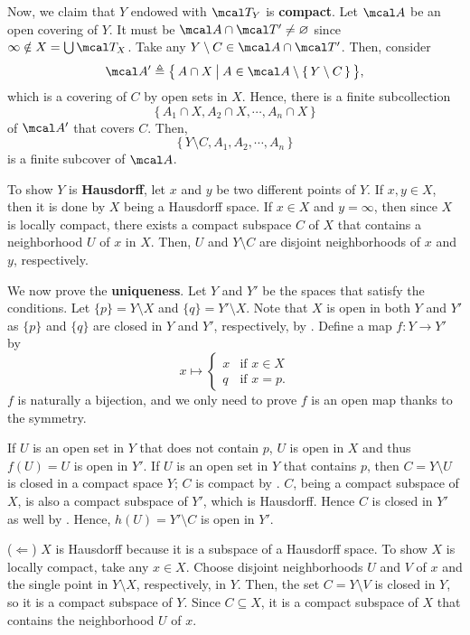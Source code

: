 \documentclass[MAS331_Note.tex]{subfiles}
\begin{document}
{    Now, we claim that $Y$ endowed with $\mcal T_Y$ is \textbf{compact}.
    Let $\mcal A$ be an open covering of $Y$.
    It must be $\mcal A \cap \mcal T' \neq \varnothing$
    since $\infty \notin X = \bigcup \mcal T_X$.
    Take any $Y \setminus C \in \mcal A \cap \mcal T'$.
    Then, consider
    \[
        \mcal A' \triangleq \big\{\,A \cap X \:\big|\:
        A \in \mcal A \setminus \{\,Y \setminus C\,\}\,\big\}\text{,}
    \]
    which is a covering of $C$ by open sets in $X$.
    Hence, there is a finite subcollection
    \[
        \{\,A_1 \cap X, A_2 \cap X, \cdots, A_n \cap X\,\}
    \]
    of $\mcal A'$ that covers $C$.
    Then,
    \[
        \{\,Y \setminus C, A_1, A_2, \cdots, A_n\,\}
    \]
    is a finite subcover of $\mcal A$.

    To show $Y$ is \textbf{Hausdorff}, let $x$ and $y$ be
    two different points of $Y$.
    If $x, y \in X$, then it is done by
    $X$ being a Hausdorff space.
    If $x \in X$ and $y = \infty$,
    then since $X$ is locally compact,
    there exists a compact subspace $C$ of $X$
    that contains a neighborhood $U$ of $x$ in $X$.
    Then, $U$ and $Y \setminus C$
    are disjoint neighborhoods of $x$ and $y$, respectively.

    We now prove the \textbf{uniqueness}.
    Let $Y$ and $Y'$ be the spaces that satisfy the conditions.
    Let $\{p\} = Y \setminus X$ and $\{q\} = Y' \setminus X$.
    Note that $X$ is open in both $Y$ and $Y'$
    as $\{p\}$ and $\{q\}$ are closed in $Y$ and $Y'$, respectively,
    by .
    Define a map $f \colon Y \to Y'$ by
    \[
        x \mapsto \begin{cases}
            x & \text{if } x \in X \\
            q & \text{if } x = p\text{.}
        \end{cases}
    \]
    $f$ is naturally a bijection, and we only need to prove
    $f$ is an open map thanks to the symmetry.

    If $U$ is an open set in $Y$ that does not contain $p$,
    $U$ is open in $X$ and thus $f(U) = U$ is open in $Y'$.
    If $U$ is an open set in $Y$ that contains $p$,
    then $C = Y \setminus U$ is closed in a compact space $Y$;
    $C$ is compact by .
    $C$, being a compact subspace of $X$,
    is also a compact subspace of $Y'$, which is Hausdorff.
    Hence $C$ is closed in $Y'$ as well by .
    Hence, $h(U) = Y' \setminus C$ is open in $Y'$.
    
    ($\Leftarrow$)
    $X$ is Hausdorff because it is a subspace of a Hausdorff space.
    To show $X$ is locally compact, take any $x \in X$.
    Choose disjoint neighborhoods $U$ and $V$ of $x$ and the single point in
    $Y \setminus X$, respectively, in $Y$. Then, the set $C = Y \setminus V$ is
    closed in $Y$, so it is a compact subspace of $Y$.
    Since $C \subseteq X$, it is a compact subspace of $X$ that contains the
    neighborhood $U$ of $x$.
}
\end{document}
